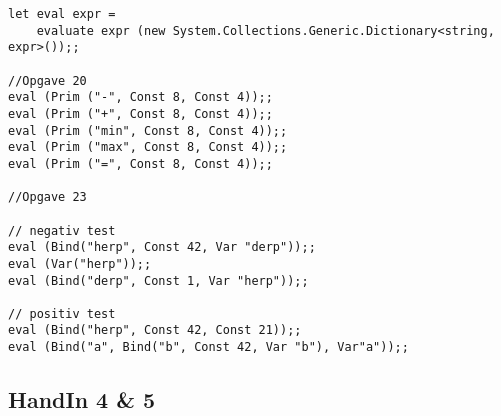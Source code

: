 \begin{lstlisting}
let eval expr =
    evaluate expr (new System.Collections.Generic.Dictionary<string, expr>());;

//Opgave 20
eval (Prim ("-", Const 8, Const 4));;
eval (Prim ("+", Const 8, Const 4));;
eval (Prim ("min", Const 8, Const 4));;
eval (Prim ("max", Const 8, Const 4));;
eval (Prim ("=", Const 8, Const 4));;

//Opgave 23

// negativ test
eval (Bind("herp", Const 42, Var "derp"));;
eval (Var("herp"));;
eval (Bind("derp", Const 1, Var "herp"));;

// positiv test
eval (Bind("herp", Const 42, Const 21));;
eval (Bind("a", Bind("b", Const 42, Var "b"), Var"a"));;

\end{lstlisting}

\subsection{HandIn 4 \& 5}
\label{Appendix_FSharp_Frederik_4and5}
